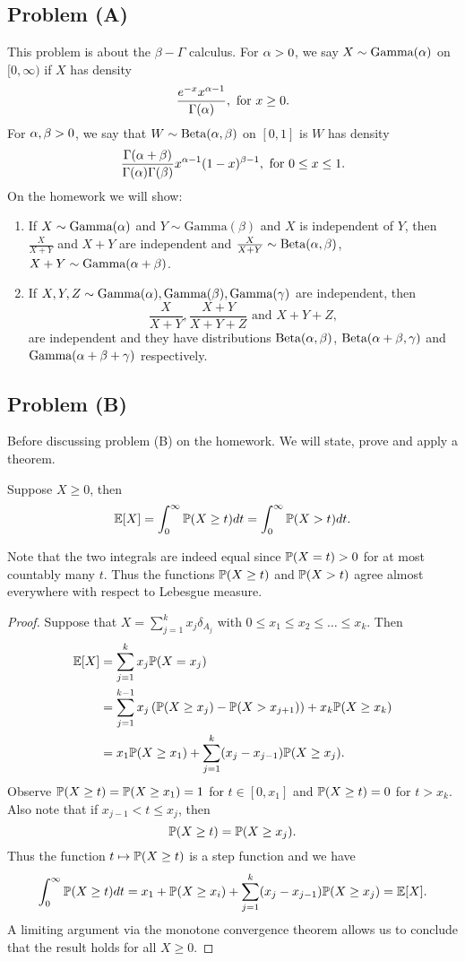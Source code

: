 \subsection{Problem (A)}
This problem is about the $\beta-\Gamma$ calculus. For ${\alpha} >0$, we say $X \sim \text{Gamma}({\alpha})$ on $[0,\infty)$ if $X$ has density 
\[\frac{e^{-x}x^{{\alpha}-1}}{\Gamma({\alpha})}, \text{ for } x \ge 0. \]
For ${\alpha},\beta > 0$, we say that $W \sim \text{Beta}({\alpha},\beta)$ on $[0,1]$ is $W$ has density 
\[\frac{\Gamma({\alpha}+\beta)}{\Gamma({\alpha})\Gamma(\beta)} x^{{\alpha}-1}(1-x)^{\beta-1}, \text{ for } 0\le x \le 1. \]
On the homework we will show:
\begin{enumerate}
    \item If $X \sim \text{Gamma}({\alpha})$ and $Y \sim \text{Gamma}(\beta)$ and $X$ is independent of $Y$, then $\frac{X}{X+Y}$ and $X+Y$ are independent and $\frac{X}{X+Y} \sim \text{Beta}({\alpha},\beta)$, $X+Y \sim \text{Gamma}({\alpha}+\beta)$.
    \item If $X,Y,Z \sim \text{Gamma}({\alpha}),\text{Gamma}(\beta), \text{Gamma}(\gamma)$ are independent, then 
    \[\frac{X}{X+Y}, \frac{X+Y}{X+Y+Z} \text{ and } X+Y+Z,\]
    are independent and they have distributions $\text{Beta}({\alpha},\beta)$, $\text{Beta}({\alpha}+\beta,\gamma)$ and $\text{Gamma}({\alpha}+\beta+\gamma)$ respectively.
\end{enumerate}
\subsection{Problem (B)}
Before discussing problem (B) on the homework. We will state, prove and apply a theorem.
\begin{thrm}
    Suppose $X \ge 0$, then 
    \[{\mathbb{E}}[X] = \int_0^\infty {\mathbb{P}}(X \ge t)dt = \int_0^\infty {\mathbb{P}}(X >t)dt. \]
\end{thrm}
Note that the two integrals are indeed equal since ${\mathbb{P}}(X=t) >0$ for at most countably many $t$. Thus the functions ${\mathbb{P}}(X\ge t)$ and ${\mathbb{P}}(X>t)$ agree almost everywhere with respect to Lebesgue measure. 
\begin{proof}
    Suppose that $X = \sum_{j=1}^k x_j \delta_{A_j}$ with $0 \le x_1\le x_2\le \ldots\le x_k$. Then 
    \begin{align*}
        {\mathbb{E}}[X] &=\sum_{j=1}^k x_j {\mathbb{P}}(X=x_j)\\
        &=\sum_{j=1}^{k-1}x_j\left({\mathbb{P}}(X\ge x_j)-{\mathbb{P}}(X>x_{j+1})\right)+x_k{\mathbb{P}}(X\ge x_k)\\
        &=x_1{\mathbb{P}}(X \ge x_1)+\sum_{j=1}^k(x_j-x_{j-1}){\mathbb{P}}(X \ge x_j).
    \end{align*}
    Observe ${\mathbb{P}}(X \ge t) = {\mathbb{P}}(X \ge x_1) = 1$ for $t \in [0,x_1]$ and ${\mathbb{P}}(X \ge t) = 0$ for $t > x_k$. Also note that if $x_{j-1} < t \le x_j$, then 
    \[{\mathbb{P}}(X \ge t) = {\mathbb{P}}(X \ge x_j). \]
    Thus the function $t \mapsto {\mathbb{P}}(X \ge t)$ is a step function and we have 
    \[\int_0^\infty {\mathbb{P}}(X \ge t)dt = x_1+{\mathbb{P}}(X\ge x_i)+\sum_{j=1}^k (x_j-x_{j-1}){\mathbb{P}}(X \ge x_j) = {\mathbb{E}}[X]. \]
    A limiting argument via the monotone convergence theorem allows us to conclude that the result holds for all $X \ge 0$. 
\end{proof}
